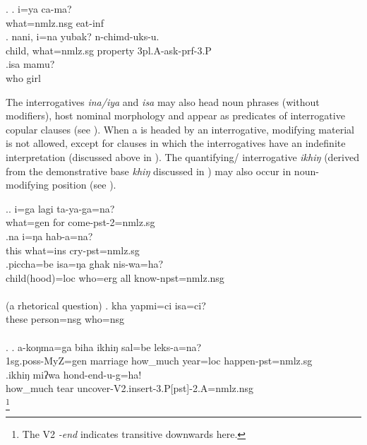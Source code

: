 \ex. \ag. i=ya ca-ma?\\
		what{\sc =nmlz.nsg} eat{\sc -inf}\\
	\bg.  nani, i=na yubak? n-chimd-uks-u.\\
		child, what{\sc =nmlz.sg}	property {\sc 3pl.A-}ask{\sc -prf-3.P}\\
		 
		\bg.isa mamu?\\
		who girl\\

The interrogatives \emph{ina/iya} and \emph{isa} may also head noun phrases (without modifiers), host nominal morphology and appear as predicates of interrogative copular clauses (see \Next). When a  is headed by an interrogative, modifying material is not allowed, except for clauses in which the interrogatives have an indefinite interpretation (discussed above in ).  The quantifying/ interrogative \emph{ikhiŋ} (derived from the demonstrative base \emph{khiŋ} discussed in ) may also occur in noun-modifying position (see \NNext).

\ex.\ag. i=ga lagi ta-ya-ga=na?\\
	what{\sc =gen} for come{\sc -pst-2=nmlz.sg}\\
\bg.na   i=ŋa      hab-a=na?\\
this what{\sc =ins} cry{\sc [3sg]-pst=nmlz.sg}\\
 
	\bg.piccha=be    isa=ŋa   ghak nis-wa=ha?\\
	child(hood){\sc =loc} who{\sc =erg} all know{\sc [3A;3.P]-npst=nmlz.nsg}\\
	  \\
	(a rhetorical question)
	\bg.	kha yapmi=ci isa=ci?\\
			these  person{\sc =nsg} who{\sc =nsg} \\
			 \\
	
\ex. \ag. a-koŋma=ga      biha     ikhiŋ   sal=be     leks-a=na?\\
{\sc 1sg.poss-}MyZ{\sc =gen}  marriage how\_much year{\sc =loc} happen{\sc [3sg]-pst=nmlz.sg}\\
 
\bg.ikhiŋ   miʔwa hond-end-u-g=ha!\\
how\_much tear uncover{\sc -V2.insert-3.P[pst]-2.A=nmlz.nsg}\\
\footnote{The V2 \emph{-end} indicates transitive  downwards here.} 

